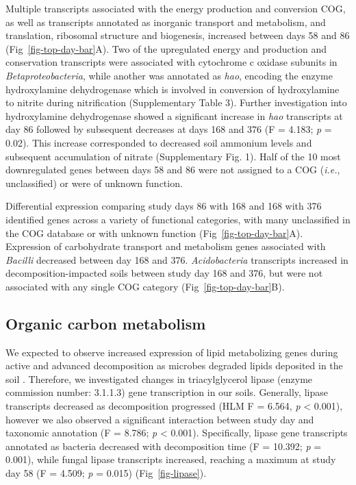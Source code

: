 \documentclass[
  sn-nature,
  lineno, referee]{sn-jnl}
\begin{document}
Multiple transcripts associated with the energy production and
conversion COG, as well as transcripts annotated as inorganic transport
and metabolism, and translation, ribosomal structure and biogenesis,
increased between days 58 and 86 (Fig~\ref{fig-top-day-bar}A). Two of
the upregulated energy and production and conservation transcripts were
associated with cytochrome c oxidase subunits in
\emph{Betaproteobacteria}, while another was annotated as \emph{hao},
encoding the enzyme hydroxylamine dehydrogenase which is involved in
conversion of hydroxylamine to nitrite during nitrification
(Supplementary Table 3). Further investigation into hydroxylamine
dehydrogenase showed a significant increase in \emph{hao} transcripts at
day 86 followed by subsequent decreases at days 168 and 376 (F = 4.183;
\emph{p} = 0.02). This increase corresponded to decreased soil ammonium
levels and subsequent accumulation of nitrate (Supplementary Fig. 1).
Half of the 10 most downregulated genes between days 58 and 86 were not
assigned to a COG (\emph{i.e.}, unclassified) or were of unknown
function.

Differential expression comparing study days 86 with 168 and 168 with
376 identified genes across a variety of functional categories, with
many unclassified in the COG database or with unknown function
(Fig~\ref{fig-top-day-bar}A). Expression of carbohydrate transport and
metabolism genes associated with \emph{Bacilli} decreased between day
168 and 376. \emph{Acidobacteria} transcripts increased in
decomposition-impacted soils between study day 168 and 376, but were not
associated with any single COG category (Fig~\ref{fig-top-day-bar}B).

\subsection{Organic carbon metabolism}\label{organic-carbon-metabolism}

We expected to observe increased expression of lipid metabolizing genes
during active and advanced decomposition as microbes degraded lipids
deposited in the soil \citep{howard_characterization_2010}. Therefore,
we investigated changes in triacylglycerol lipase (enzyme commission
number: 3.1.1.3) gene transcription in our soils. Generally, lipase
transcripts decreased as decomposition progressed (HLM F = 6.564,
\emph{p} \textless{} 0.001), however we also observed a significant
interaction between study day and taxonomic annotation (F = 8.786;
\emph{p} \textless{} 0.001). Specifically, lipase gene transcripts
annotated as bacteria decreased with decomposition time (F = 10.392;
\emph{p} = 0.001), while fungal lipase transcripts increased, reaching a
maximum at study day 58 (F = 4.509; \emph{p} = 0.015)
(Fig~\ref{fig-lipase}).
\end{document}
